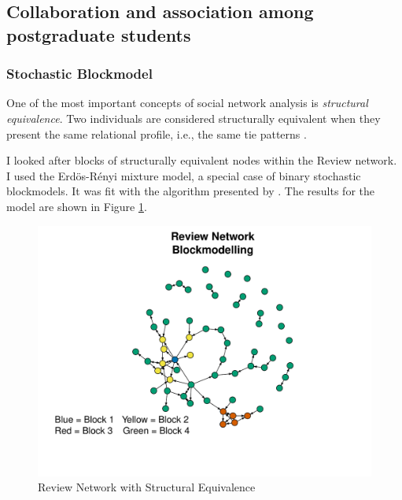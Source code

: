 \documentclass[12pt, english]{article}
\begin{document}
\subsection{Collaboration and association among postgraduate students}
\subsubsection{Stochastic Blockmodel}

One of the most important concepts of social network analysis is \textit{structural equivalence}. Two individuals are considered structurally equivalent when they present the same relational profile, i.e., the same tie patterns \cite{lazega2014redes,denooy2011exploratory,wasserman1994social}. 

I looked after blocks of structurally equivalent nodes within the Review network. I used the Erdös-Rényi mixture model, a special case of binary stochastic blockmodels. It was fit with the algorithm presented by \cite{daudin2008mixture}. The results for the model are shown in Figure \ref{net-blocks}. 




\begin{figure}[h]
	\centering

	\label{net-blocks}
	\includegraphics[scale=.6]{net_block.pdf}
	\caption{Review Network with Structural Equivalence}
\end{figure}
\end{document}
